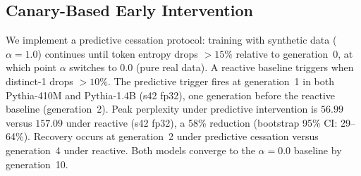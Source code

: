 \begin{table}[t]
\centering
\small
\caption{Cross-architecture PermG forward detection ($\alpha{=}1.0$). Detection (${\geq}$6/8) confirmed in 11/15 conditions (73\%) across six model families, scales from 345M to 6.9B, and two domains.}
\label{tab:generalization}
\end{table}


\subsection{Canary-Based Early Intervention}
\label{sec:intervention}

We implement a predictive cessation protocol: training with synthetic data ($\alpha{=}1.0$) continues until token entropy drops ${>}15\%$ relative to generation~0, at which point $\alpha$ switches to $0.0$ (pure real data).
A reactive baseline triggers when distinct-1 drops ${>}10\%$.
The predictive trigger fires at generation~1 in both Pythia-410M and Pythia-1.4B (s42 fp32), one generation before the reactive baseline (generation~2).
Peak perplexity under predictive intervention is $56.99$ versus $157.09$ under reactive (s42 fp32), a 58\% reduction (bootstrap 95\% CI: 29--64\%).
Recovery occurs at generation~2 under predictive cessation versus generation~4 under reactive.
Both models converge to the $\alpha{=}0.0$ baseline by generation~10.

